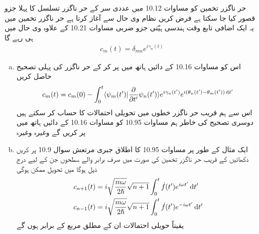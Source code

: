 حر ناگزر تخمین کو مساوات 10.12 میں عددی سر  کے حر ناگزر تسلسل کا پہلا جزو قصور کیا جا سکتا ہے فرض کریں نظام  وی حال سے آغاز کرتا ہے حر ناگزر تخمین میں یہ ایک اضافی تابع وقت ہندسی ہیّتی جزو ضربی مساوات 10.21 کے علاوہ  وی حال میں ہی رہے گا 
\begin{align*} 
c_m (t) = \delta_{mn} e^{i \gamma_n (t)}
\end{align*} 
\begin{enumerate}[a.]
\item
اس کو مساوات 10.16 کے دائیں ہاتھ میں پر کر کے حر ناگزر کی پہلی تصحیح حاصل کریں 
\begin{align}
c_m (t) = c_m (0) - \int_0^t \langle \psi_m (t') | \frac{\partial}{\partial t'} \psi_n (t') \rangle e^{i \gamma_n (t')} e^{i (\theta_n (t') - \theta_m (t')) \dif t'}
\end{align}
اس سے ہم قریب حر ناگزر خطوں میں تحویلی احتمالات کا حساب کر سکتے ہیں دوسری تصحیح کی خاطر ہم مساوات 10.95 کو مساوات 10.16 کے دائیں ہاتھ میں پر کریں گے وغیرہ وغیرہ 
\item
ایک مثال کے طور پر مساوات 10.95 کا اطلاق جبری مرتعش سوال 10.9 پر کریں دکھائیں کے قریب حر ناگزر تخمین کی صورت میں صرف برابر والے سطحوں جن کے لیے درج ذیل ہوگا میں تحویل ممکن ہوگی 
\begin{align*}
c_{n + 1} (t)& = i \sqrt{\frac{m \omega}{2 \hslash}} \sqrt{n + 1} \int_0^t \dot{f} (t') e^{i \omega t'} \dif t' \\
c_{n - 1} (t) &= i \sqrt{\frac{m \omega}{2 \hslash}} \sqrt{n + 1} \int_0^t \dot{f} (t') e^{-i \omega t'} \dif t'
\end{align*}
یقیناً حویلی احتمالات ان کے مطلق مربع کے برابر ہوں گے 
\end{enumerate}

